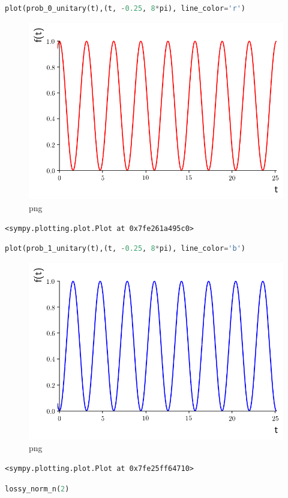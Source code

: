 \begin{lstlisting}[language=Python]
plot(prob_0_unitary(t),(t, -0.25, 8*pi), line_color='r')
\end{lstlisting}

\begin{figure}
\centering
\includegraphics[width=0.6\linewidth]{output_41_0.png}
\caption{png}
\end{figure}

\begin{lstlisting}
<sympy.plotting.plot.Plot at 0x7fe261a495c0>
\end{lstlisting}

\begin{lstlisting}[language=Python]
plot(prob_1_unitary(t),(t, -0.25, 8*pi), line_color='b')
\end{lstlisting}

\begin{figure}
\centering
\includegraphics[width=0.6\linewidth]{output_42_0.png}
\caption{png}
\end{figure}

\begin{lstlisting}
<sympy.plotting.plot.Plot at 0x7fe25ff64710>
\end{lstlisting}

\begin{lstlisting}[language=Python]
lossy_norm_n(2)
\end{lstlisting}


